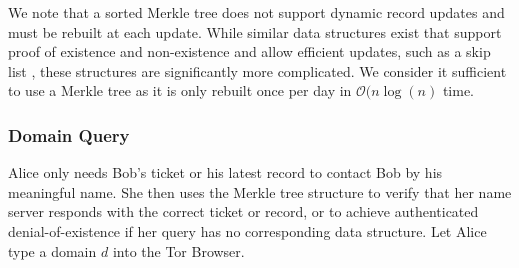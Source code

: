 \documentclass[USenglish,oneside,twocolumn]{article}
\begin{document}
We note that a sorted Merkle tree does not support dynamic record updates and must be rebuilt at each update. While similar data structures exist that support proof of existence and non-existence and allow efficient updates, such as a skip list \cite{goodrich2001implementation}, these structures are significantly more complicated. We consider it sufficient to use a Merkle tree as it is only rebuilt once per day in $ \mathcal{O}(n \log(n) $ time.





% 

\subsubsection{Domain Query} %

Alice only needs Bob's ticket or his latest record to contact Bob by his meaningful name. She then uses the Merkle tree structure to verify that her name server responds with the correct ticket or record, or to achieve authenticated denial-of-existence if her query has no corresponding data structure. Let Alice type a domain $ d $ into the Tor Browser.
\end{document}
